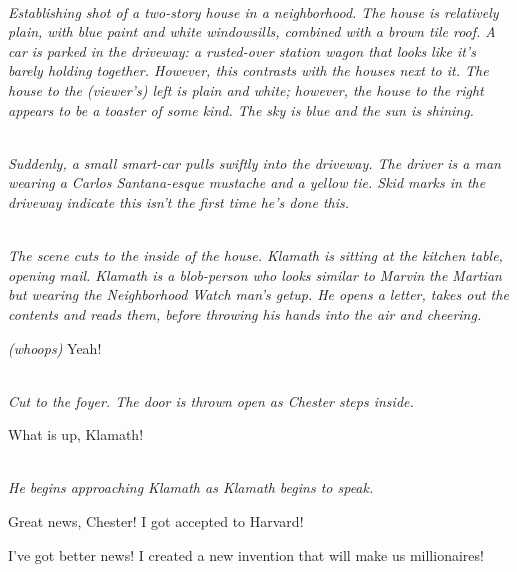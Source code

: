 \documentclass[11pt,a4paper,oneside]{memoir}  %
\begin{document}
\begin{description}[itemsep=1ex,leftmargin=1cm]

\item[] \hfill \\
\textit{Establishing shot of a two-story house in a neighborhood. The house is relatively plain, with blue paint and white windowsills, combined with a brown tile roof. A car is parked in the driveway: a rusted-over station wagon that looks like it's barely holding together. However, this contrasts with the houses next to it. The house to the (viewer's) left is plain and white; however, the house to the right appears to be a toaster of some kind. The sky is blue and the sun is shining.}

\item[] \hfill \\
\textit{Suddenly, a small smart-car pulls swiftly into the driveway. The driver is a man wearing a Carlos Santana-esque mustache and a yellow tie. Skid marks in the driveway indicate this isn't the first time he's done this.}

\item[] \hfill \\
\textit{The scene cuts to the inside of the house. Klamath is sitting at the kitchen table, opening mail. Klamath is a blob-person who looks similar to Marvin the Martian but wearing the Neighborhood Watch man's getup. He opens a letter, takes out the contents and reads them, before throwing his hands into the air and cheering.}

\item[KLAMATH] \textit{(whoops)} Yeah!

\item[] \hfill \\
\textit{Cut to the foyer. The door is thrown open as Chester steps inside.}

\item[CHESTER] What is up, Klamath!

\item[] \hfill \\
\textit{He begins approaching Klamath as Klamath begins to speak.}

\item[KLAMATH] Great news, Chester! I got accepted to Harvard!

\item[CHESTER] I've got better news! I created a new invention that will make us millionaires!


\end{description}
\end{document}
